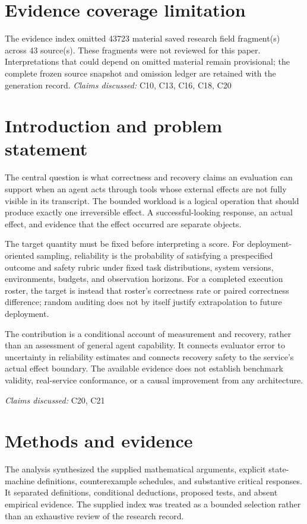 \documentclass[11pt]{article}
\begin{document}
\section*{Evidence coverage limitation}
The evidence index omitted 43723 material saved research field fragment(s) across 43 source(s). These fragments were not reviewed for this paper. Interpretations that could depend on omitted material remain provisional; the complete frozen source snapshot and omission ledger are retained with the generation record.
\textit{Claims discussed: }C10, C13, C16, C18, C20
\section{Introduction and problem statement}
The central question is what correctness and recovery claims an evaluation can support when an agent acts through tools whose external effects are not fully visible in its transcript. The bounded workload is a logical operation that should produce exactly one irreversible effect. A successful-looking response, an actual effect, and evidence that the effect occurred are separate objects.

The target quantity must be fixed before interpreting a score. For deployment-oriented sampling, reliability is the probability of satisfying a prespecified outcome and safety rubric under fixed task distributions, system versions, environments, budgets, and observation horizons. For a completed execution roster, the target is instead that roster's correctness rate or paired correctness difference; random auditing does not by itself justify extrapolation to future deployment.

The contribution is a conditional account of measurement and recovery, rather than an assessment of general agent capability. It connects evaluator error to uncertainty in reliability estimates and connects recovery safety to the service's actual effect boundary. The available evidence does not establish benchmark validity, real-service conformance, or a causal improvement from any architecture.

\textit{Claims discussed: }C20, C21
\section{Methods and evidence}
The analysis synthesized the supplied mathematical arguments, explicit state-machine definitions, counterexample schedules, and substantive critical responses. It separated definitions, conditional deductions, proposed tests, and absent empirical evidence. The supplied index was treated as a bounded selection rather than an exhaustive review of the research record.
\end{document}
